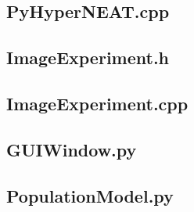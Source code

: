 \documentclass[a4paper,10pt]{article}
\begin{document}
\subsection{PyHyperNEAT.cpp}


%

\subsection{ImageExperiment.h}


\subsection{ImageExperiment.cpp}


\subsection{GUIWindow.py}


\subsection{PopulationModel.py}

\end{document}
